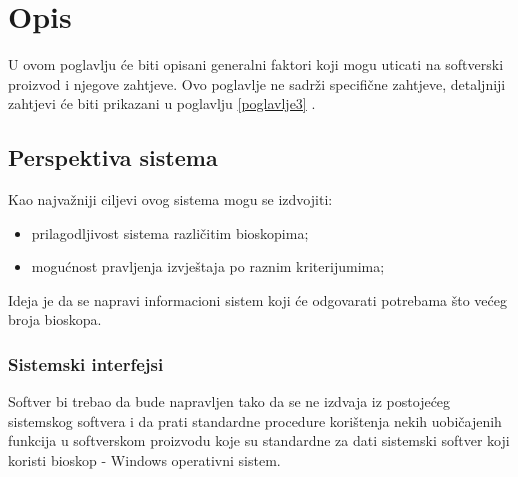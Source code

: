 \chapter{Opis}
U ovom poglavlju će biti opisani generalni faktori koji mogu uticati na softverski proizvod i njegove zahtjeve. 
Ovo poglavlje ne sadrži specifične zahtjeve, detaljniji zahtjevi će biti prikazani u poglavlju \ref{poglavlje3} .

\section{Perspektiva sistema}

Kao najvažniji ciljevi ovog sistema mogu se izdvojiti:
\begin{itemize}
  \item prilagodljivost sistema različitim bioskopima;
  \item mogućnost pravljenja izvještaja po raznim kriterijumima;
\end{itemize}

Ideja je da se napravi informacioni sistem koji će odgovarati potrebama što većeg broja bioskopa.

\subsection{Sistemski interfejsi}

Softver bi trebao da bude napravljen tako da se ne izdvaja iz postojećeg sistemskog softvera i da prati standardne procedure korištenja nekih uobičajenih funkcija u softverskom proizvodu koje su standardne za dati sistemski softver koji koristi bioskop - Windows operativni sistem. 


